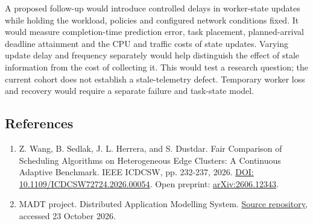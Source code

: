 \documentclass[11pt,a4paper]{article}
\begin{document}
A proposed follow-up would introduce controlled delays in worker-state
updates while holding the workload, policies and configured network
conditions fixed. It would measure completion-time prediction error,
task placement, planned-arrival deadline attainment and the CPU and
traffic costs of state updates. Varying update delay and frequency
separately would help distinguish the effect of stale information from
the cost of collecting it. This would test a research question; the
current cohort does not establish a stale-telemetry defect. Temporary
worker loss and recovery would require a separate failure and task-state
model.

\subsection{References}\label{references}

\begin{enumerate}
\def\labelenumi{\arabic{enumi}.}
\tightlist
\item
  Z. Wang, B. Sedlak, J. L. Herrera, and S. Dustdar.
  \textquotesingle Fair Comparison of Scheduling Algorithms on
  Heterogeneous Edge Clusters: A Continuous Adaptive
  Benchmark.\textquotesingle{} IEEE ICDCSW, pp. 232-237, 2026.
  \href{https://doi.org/10.1109/ICDCSW72724.2026.00054}{DOI:
  10.1109/ICDCSW72724.2026.00054}. Open preprint:
  \href{https://arxiv.org/abs/2606.12343}{arXiv:2606.12343}.
\item
  MADT project. \textquotesingle Distributed Application Modelling
  System.\textquotesingle{}
  \href{https://github.com/dltcspbu/madt}{Source repository}, accessed
  23 October 2026.
\end{enumerate}
\end{document}
